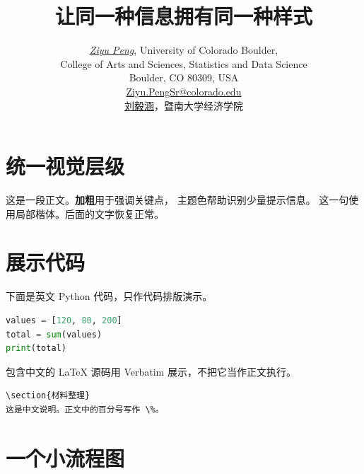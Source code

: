 \documentclass[UTF8,a4paper,fontset=fandol]{ctexart}
\title{让同一种信息拥有同一种样式}
\author{\href{https://github.com/pzy54154631-hub}{\textit{Ziyu Peng}}, University of Colorado Boulder,
  \\[0.1em]College of Arts and Sciences, Statistics and Data Science
  \\[0.1em]Boulder, CO 80309, USA
  \\[0.1em]\href{mailto:Ziyu.PengSr@colorado.edu}{Ziyu.PengSr@colorado.edu}
  \\[0.35em]
  \href{https://pzy54154631-hub.github.io/liuyihan/}{刘毅涵}，暨南大学经济学院}
\date{}
\begin{document}
\maketitle
\section{统一视觉层级}
这是一段正文。\textbf{加粗}用于强调关键点，
\textcolor{inkblue}{主题色}帮助识别少量提示信息。
{\kaishu 这一句使用局部楷体。}后面的文字恢复正常。
\section{展示代码}
下面是英文 Python 代码，只作代码排版演示。
\begin{lstlisting}[language=Python]
values = [120, 80, 200]
total = sum(values)
print(total)
\end{lstlisting}
包含中文的 LaTeX 源码用 Verbatim 展示，不把它当作正文执行。
\begin{Verbatim}[breaklines=true,fontsize=\small,frame=single]
\section{材料整理}
这是中文说明。正文中的百分号写作 \%。
\end{Verbatim}
\section{一个小流程图}
\begin{center}
\end{center}
\end{document}

